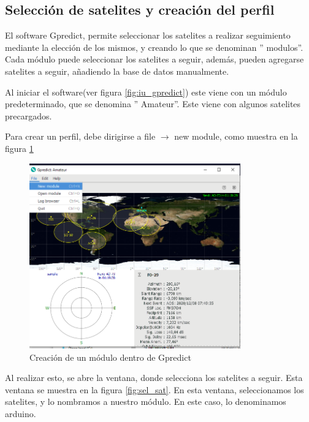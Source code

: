 \subsection{Selección de satelites y creación del perfil} 

El software Gpredict, permite seleccionar los satelites a realizar seguimiento mediante la elección de los mismos, y creando lo que se denominan '' modulos''. Cada módulo puede seleccionar los satelites a seguir, además, pueden agregarse satelites a seguir, añadiendo la base de datos manualmente.

Al iniciar el software(ver figura \ref{fig:iu_gpredict}) este viene con un módulo predeterminado, que se denomina '' Amateur''. Este viene con algunos satelites precargados. 

Para crear un perfil, debe dirigirse a file $\rightarrow$ new module, como muestra en la figura \ref{fig:create_modul_gpred}  
\begin{figure}[ht]
	\centering
	\includegraphics[width=\textwidth,height=8cm]{create_module}
	\caption{Creación de un módulo dentro de Gpredict} 
	\label{fig:create_modul_gpred}	
\end{figure}
Al realizar esto, se abre la ventana, donde selecciona los satelites a seguir. Esta ventana se muestra en la figura \ref{fig:sel_sat}. En esta ventana, seleccionamos los satelites, y lo nombramos a nuestro módulo. En este caso, lo denominamos arduino. 


